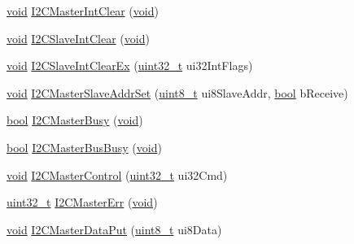 \begin{DoxyCompactItemize}
\item 
\hyperlink{usb__devapi_8h_afabf60e7f57651d6d595a02c75f07cd0}{void} \hyperlink{group__i2c__api_gadb05446393293b14cc86211fb5e59b8d}{I2\+C\+Master\+Int\+Clear} (\hyperlink{usb__devapi_8h_afabf60e7f57651d6d595a02c75f07cd0}{void})
\item 
\hyperlink{usb__devapi_8h_afabf60e7f57651d6d595a02c75f07cd0}{void} \hyperlink{group__i2c__api_ga86727bec16400449cb39a6341b42c7a9}{I2\+C\+Slave\+Int\+Clear} (\hyperlink{usb__devapi_8h_afabf60e7f57651d6d595a02c75f07cd0}{void})
\item 
\hyperlink{usb__devapi_8h_afabf60e7f57651d6d595a02c75f07cd0}{void} \hyperlink{group__i2c__api_ga962968207faa0b75d3fcf792310e7877}{I2\+C\+Slave\+Int\+Clear\+Ex} (\hyperlink{_p_e___types_8h_a33594304e786b158f3fb30289278f5af}{uint32\+\_\+t} ui32\+Int\+Flags)
\item 
\hyperlink{usb__devapi_8h_afabf60e7f57651d6d595a02c75f07cd0}{void} \hyperlink{group__i2c__api_ga95d82808b2a27cd139698efbec513a67}{I2\+C\+Master\+Slave\+Addr\+Set} (\hyperlink{_p_e___types_8h_aba7bc1797add20fe3efdf37ced1182c5}{uint8\+\_\+t} ui8\+Slave\+Addr, \hyperlink{_p_e___types_8h_a97a80ca1602ebf2303258971a2c938e2}{bool} b\+Receive)
\item 
\hyperlink{_p_e___types_8h_a97a80ca1602ebf2303258971a2c938e2}{bool} \hyperlink{group__i2c__api_gaf5e83323ac50e404b712aa2161a75b40}{I2\+C\+Master\+Busy} (\hyperlink{usb__devapi_8h_afabf60e7f57651d6d595a02c75f07cd0}{void})
\item 
\hyperlink{_p_e___types_8h_a97a80ca1602ebf2303258971a2c938e2}{bool} \hyperlink{group__i2c__api_gaf97ea5be165c207bc792fa5bd7331243}{I2\+C\+Master\+Bus\+Busy} (\hyperlink{usb__devapi_8h_afabf60e7f57651d6d595a02c75f07cd0}{void})
\item 
\hyperlink{usb__devapi_8h_afabf60e7f57651d6d595a02c75f07cd0}{void} \hyperlink{group__i2c__api_ga041714345a1a2d7d94917fe881061d3f}{I2\+C\+Master\+Control} (\hyperlink{_p_e___types_8h_a33594304e786b158f3fb30289278f5af}{uint32\+\_\+t} ui32\+Cmd)
\item 
\hyperlink{_p_e___types_8h_a33594304e786b158f3fb30289278f5af}{uint32\+\_\+t} \hyperlink{group__i2c__api_gabb8efce4d819b7601821eb56595eb249}{I2\+C\+Master\+Err} (\hyperlink{usb__devapi_8h_afabf60e7f57651d6d595a02c75f07cd0}{void})
\item 
\hyperlink{usb__devapi_8h_afabf60e7f57651d6d595a02c75f07cd0}{void} \hyperlink{group__i2c__api_gaefd4234aea3087471598f756beaab58d}{I2\+C\+Master\+Data\+Put} (\hyperlink{_p_e___types_8h_aba7bc1797add20fe3efdf37ced1182c5}{uint8\+\_\+t} ui8\+Data)

\end{DoxyCompactItemize}
